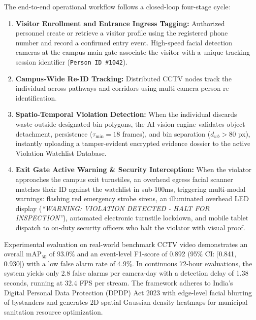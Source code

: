 \documentclass[12pt,a4paper]{report}
\begin{document}
The end-to-end operational workflow follows a closed-loop four-stage cycle:
\begin{enumerate}
\item \textbf{Visitor Enrollment and Entrance Ingress Tagging:} Authorized personnel create or retrieve a visitor profile using the registered phone number and record a confirmed entry event. High-speed facial detection cameras at the campus main gate associate the visitor with a unique tracking session identifier (\texttt{Person ID \#1042}).
\item \textbf{Campus-Wide Re-ID Tracking:} Distributed CCTV nodes track the individual across pathways and corridors using multi-camera person re-identification.
\item \textbf{Spatio-Temporal Violation Detection:} When the individual discards waste outside designated bin polygons, the AI vision engine validates object detachment, persistence ($\tau_{\min} = 18$ frames), and bin separation ($d_{wb} > 80$ px), instantly uploading a tamper-evident encrypted evidence dossier to the active Violation Watchlist Database.
\item \textbf{Exit Gate Active Warning \& Security Interception:} When the violator approaches the campus exit turnstiles, an overhead egress facial scanner matches their ID against the watchlist in sub-100ms, triggering multi-modal warnings: flashing red emergency strobe sirens, an illuminated overhead LED display (\textit{``WARNING: VIOLATION DETECTED - HALT FOR INSPECTION''}), automated electronic turnstile lockdown, and mobile tablet dispatch to on-duty security officers who halt the violator with visual proof.
\end{enumerate}

Experimental evaluation on real-world benchmark CCTV video demonstrates an overall $\text{mAP}_{50}$ of 93.0\% and an event-level F1-score of 0.892 (95\% CI: [0.841, 0.930]) with a low false alarm rate of 4.9\%. In continuous 72-hour evaluations, the system yields only 2.8 false alarms per camera-day with a detection delay of 1.38 seconds, running at 32.4 FPS per stream. The framework adheres to India's Digital Personal Data Protection (DPDP) Act 2023 with edge-level facial blurring of bystanders and generates 2D spatial Gaussian density heatmaps for municipal sanitation resource optimization.

\newpage
\tableofcontents
\end{document}
